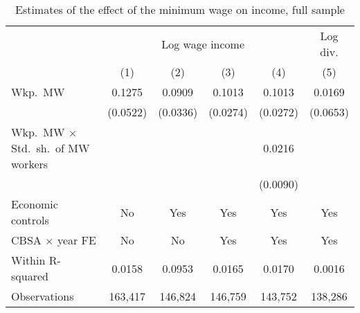 \begin{table}[hbt!]
    \centering
    \caption{Estimates of the effect of the minimum wage on income, full sample}
    \label{tab:static_wages}

    \begin{tabular}{@{}lccccc@{}}
        \toprule
                                & \multicolumn{4}{c}{Log wage income}
                                & \multicolumn{1}{c}{Log div.}                             \\ \cmidrule(lr){2-5}\cmidrule(lr){6-6}
                                & (1)       & (2)      & (3)      & (4)       & (5)        \\ \midrule
        Wkp.\ MW            & 0.1275       & 0.0909      & 0.1013      & 0.1013       & 0.0169        \\
                                & (0.0522)     & (0.0336)    & (0.0274)    & (0.0272)     & (0.0653)      \\
        Wkp.\ MW $\times$ Std.\ 
            sh.\ of MW workers &           &          &          & 0.0216       &            \\
                                &           &          &          & (0.0090)     &            \\ \midrule
        Economic controls       & No        & Yes      & Yes      & Yes       & Yes        \\
        CBSA $\times$ year FE   & No        & No       & Yes      & Yes       & Yes        \\
        Within R-squared        & 0.0158       & 0.0953      & 0.0165      & 0.0170       & 0.0016        \\
        Observations            & 163,417      & 146,824     & 146,759     & 143,752      & 138,286       \\ \bottomrule
    \end{tabular}


\end{table}
